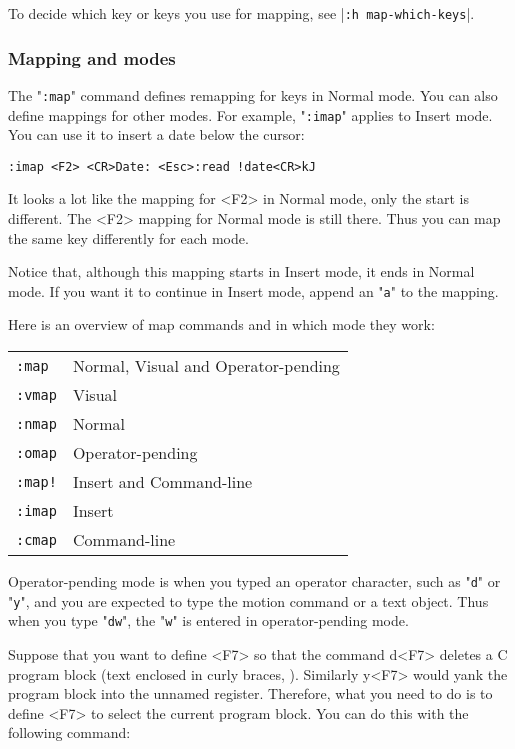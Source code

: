 To decide which key or keys you use for mapping, see |\texttt{:h map-which-keys}|.

\subsubsection{Mapping and modes}
The "\texttt{:map}" command defines remapping for keys in Normal mode.
You can also define mappings for other modes.
For example, "\texttt{:imap}" applies to Insert mode.
You can use it to insert a date below the cursor:

\begin{Verbatim}[samepage=true]
 :imap <F2> <CR>Date: <Esc>:read !date<CR>kJ
\end{Verbatim}

It looks a lot like the mapping for <F2> in Normal mode, only the start is different.
The <F2> mapping for Normal mode is still there.
Thus you can map the same key differently for each mode.

Notice that, although this mapping starts in Insert mode, it ends in Normal mode.
If you want it to continue in Insert mode, append an "\texttt{a}" to the mapping.

Here is an overview of map commands and in which mode they work:
\begin{center} \begin{tabular}{l l}
				\texttt{:map} & Normal, Visual and Operator-pending \\
				\texttt{:vmap} & Visual \\
				\texttt{:nmap} & Normal \\
				\texttt{:omap} & Operator-pending \\
				\texttt{:map!} & Insert and Command-line \\
				\texttt{:imap} & Insert \\
				\texttt{:cmap} & Command-line \\
\end{tabular} \end{center}

Operator-pending mode is when you typed an operator character, such as "\texttt{d}" or "\texttt{y}", and you are expected to type the motion command or a text object.
Thus when you type "\texttt{dw}", the "\texttt{w}" is entered in operator-pending mode.

Suppose that you want to define <F7> so that the command d<F7> deletes a C program block (text enclosed in curly braces, \texttt{{}}).
Similarly y<F7> would yank the program block into the unnamed register.
Therefore, what you need to do is to define <F7> to select the current program block.
You can do this with the following command:

